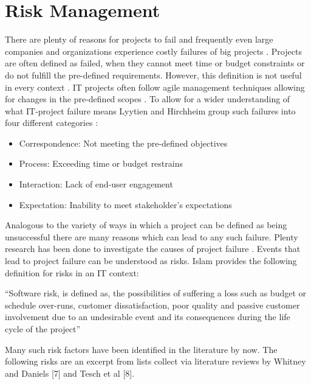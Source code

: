 \section{Risk Management}
\label{sec:theoryA}
There are plenty of reasons for projects to fail and frequently even large companies and organizations experience costly failures of big projects \cite{dwivediResearchInformationSystems2015}. Projects are often defined as failed, when they cannot meet time or budget constraints or do not fulfill the pre-defined requirements. However, this definition is not useful in every context \cite{debakkerDoesRiskManagement2010}. IT projects often follow agile management techniques allowing for changes in the pre-defined scopes \cite{kusay-merkleAgilesProjektmanagementIm2018}. To allow for a wider understanding of what IT-project failure means Lyytien and Hirchheim group such failures into four different categories \cite{lyytinenInformationSystemsFailures1988}: 
\begin{itemize}
	\item Correspondence: Not meeting the pre-defined objectives
	\item Process: Exceeding time or budget restrains
	\item Interaction: Lack of end-user engagement
	\item Expectation: Inability to meet stakeholder’s expectations
	
\end{itemize}	
Analogous to the variety of ways in which a project can be defined as being unsuccessful there are many reasons which can lead to any such failure. Plenty research has been done to investigate the causes of project failure \cite{guptaSystematicLiteratureReview2018}.  Events that lead to project failure can be understood as risks. Islam \cite{islamSoftwareDevelopmentRisk2011} provides the following definition for risks in an IT context:
\begin{fquote}
	“Software risk, is defined as, the possibilities of suffering a loss such as budget or schedule over-runs, customer dissatisfaction, poor quality and passive customer involvement due to an undesirable event and its consequences during the life cycle of the project”
\end{fquote}
Many such risk factors have been identified in the literature by now. The following risks are an excerpt from lists collect via literature reviews by Whitney and Daniels [7] and Tesch et al [8]. 

